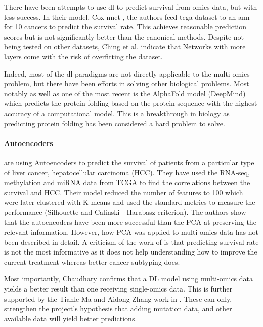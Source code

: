 There have been attempts to use \acrshort{dl} to predict survival from omics data, but with less success. In their model, Cox-nnet \cite{Ching2018-gq}, the authors feed \acrshort{tcga} dataset to an \acrshort{ann} for 10 cancers to predict the survival rate. This achieves reasonable prediction scores but is not significantly better than the canonical methods. Despite not being tested on other datasets, Ching et al. indicate that Networks with more layers come with the risk of overfitting the dataset.  


Indeed, most of the \acrshort{dl} paradigms are not directly applicable to the multi-omics problem, but there have been efforts in solving other biological problems. Most notably as well as one of the most recent is the AlphaFold model\cite{Jumper2021-du} (DeepMind) which predicts the protein folding based on the protein sequence with the highest accuracy of a computational model. This is a breakthrough in biology as predicting protein folding has been considered a hard problem to solve.


\paragraph*{Autoencoders} \label{s:lit:autoencoders}

\citet{Chaudhary2018-qj} are using Autoencoders to predict the survival of patients from a particular type of liver cancer, hepatocellular carcinoma (HCC). They have used the RNA-seq, methylation and miRNA data from TCGA to find the correlations between the survival and HCC. Their model reduced the number of features to 100 which were later clustered with K-means and used the standard metrics to measure the performance (Silhouette and Calinski - Harabasz criterion). The authors show that the autoencoders have been more successful than the PCA at preserving the relevant information. However, how PCA was applied to multi-omics data has not been described in detail. A criticism of the work of \citet{Chaudhary2018-qj} is that predicting survival rate is not the most informative as it does not help understanding how to improve the current treatment whereas better cancer subtyping does.

Most importantly, Chaudhary confirms that a DL model using multi-omics data yields a better result than one receiving single-omics data. This is further supported by the Tianle Ma and Aidong Zhang work in \cite{Ma2019-hk}. These can only, strengthen the project's hypothesis that adding mutation data, and other available data will yield better predictions.


